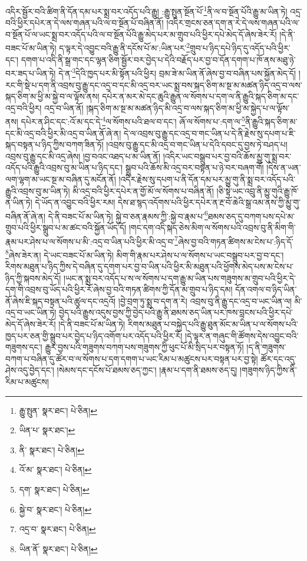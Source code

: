 འདིར་སྦྱོར་བའི་ཚིག་ནི་དོན་དམ་པར་སྨྲ་བར་འདོད་པའི་རྒྱུ། :རྒྱུ་སྤུན་སྔོན་པོ་\footnote{རྒྱུ་སྤུན་  སྣར་ཐང་།  པེ་ཅིན། }ནི་ལ་བ་སྔོན་པོའི་རྒྱུ་མ་ཡིན་ཏེ། འདྲ་བའི་ཕྱིར་དཔེར་ན་དེ་ལས་གཞན་པའི་ལ་བ་སྔོན་པོ་བཞིན་ནོ། །འདིར་གྲངས་ཅན་དག་ན་རེ་དེ་ལས་གཞན་པའི་ལ་བ་སྔོན་པོ་ལ་ཡང་སྨྲ་བར་འདོད་པའི་ལ་བ་སྔོན་པོའི་རྒྱུ་མེད་པར་མ་གྲུབ་པའི་ཕྱིར་དཔེ་མེད་དོ་ཞེས་ཟེར་རོ། །དེ་ནི་བཟང་པོ་མ་ཡིན་ཏེ། ད་ལྟར་དེ་འབྱུང་བའི་རྒྱུ་ནི་དངོས་པོ་མ་:ཡིན་པར་\footnote{ཡིན་པ་  སྣར་ཐང་། }གྲུབ་པ་ཉིད་དཔེ་ཉིད་དུ་འདོད་པའི་ཕྱིར་དང་། དགག་པ་འདི་ནི་སྒྲ་གང་དང་ལྷན་ཅིག་སྦྱོར་བར་བྱེད་པ་དེའི་བརྗོད་པར་བྱ་བ་དོན་དགག་པ་ཁོ་ནས་མཐུ་ཉེ་བར་ཟད་པ་ཡིན་ཏེ། དེ་ན་\footnote{ནི་  སྣར་ཐང་།  པེ་ཅིན། }དེའི་ཁྱད་པར་མི་སྟོན་པའི་ཕྱིར། བྲམ་ཟེ་མ་ཡིན་ནོ་ཞེས་བྱ་བ་བཞིན་པས་སྐྱོན་མེད་དོ། །རང་གི་སྡེ་པ་དག་ནི་འབྲས་བུ་རྒྱུ་དང་འདྲ་བ་དང་མི་འདྲ་བར་ཡང་སྨྲ་བས་སྐད་ཅིག་མ་སྔ་མ་མཚན་ཉིད་འདྲ་བ་ལས་སྐད་ཅིག་མ་ཕྱི་མ་སྐྱེ་བ་ལ་ལྟོས་ནས། དཔེར་ན་མར་མེ་དང་ཆུའི་རྒྱུན་ལ་སོགས་པ་དག་ལ་ནི་རྒྱུའི་སྐད་ཅིག་མ་དང་འདྲ་བའི་ཕྱིར། འདྲ་བ་ཡིན་ནོ། །སྐད་ཅིག་མ་སྔ་མ་མཚན་ཉིད་མི་འདྲ་བ་ལས་སྐད་ཅིག་མ་ཕྱི་མ་སྐྱེད་པ་ལ་ལྟོས་ནས། དཔེར་ན་ཤིང་དང་:འོ་མ་དང་དེ་\footnote{འོ་མ་  སྣར་ཐང་།  པེ་ཅིན། }ལ་སོགས་པའི་ཐལ་བ་དང་། ཞོ་ལ་སོགས་པ་:དག་ལ་\footnote{དག་  སྣར་ཐང་།  པེ་ཅིན། }ནི་རྒྱུའི་སྐད་ཅིག་མ་དང་མི་འདྲ་བའི་ཕྱིར་མི་འདྲ་བ་ཡིན་ནོ་ཞེ་ན། དེ་ལ་འབྲས་བུ་རྒྱུ་དང་འདྲ་བ་གང་ཡིན་པ་དེ་ནི་རྗེས་སུ་དཔག་པ་ཇི་སྐད་བསྟན་པ་ཉིད་ཀྱིས་བཀག་ཟིན་ཏོ། །འབྲས་བུ་རྒྱུ་དང་མི་འདྲ་བ་གང་ཡིན་པ་དེའི་དབང་དུ་བྱས་ཏེ་བཤད་པ། འབྲས་བུ་རྒྱུ་དང་མི་འདྲ་ཞེས། །བྱ་བའང་འཐད་པ་མ་ཡིན་ནོ། །འདིར་ཡང་བསྒྲུབ་པར་བྱ་བའི་ཆོས་མྱུ་གུ་སྨྲ་བར་འདོད་པའི་རྒྱུའི་འབྲས་བུ་མ་ཡིན་པ་ཉིད་དང་། སྒྲུབ་པའི་ཆོས་མི་འདྲ་བར་བསྟན་པ་ཉེ་བར་བཞག་གོ། །དེས་ན་ཡན་ལག་ལྷག་མ་ཡང་སྔ་མ་བཞིན་དུ་མངོན་ནོ། །འདིར་རྗེས་སུ་དཔག་པ་ནི་དོན་དམ་པར་མྱུ་གུ་ནི་སྨྲ་བར་འདོད་པའི་རྒྱུའི་འབྲས་བུ་མ་ཡིན་ཏེ། མི་འདྲ་བའི་ཕྱིར་དཔེར་ན་གྱོ་མོ་ལ་སོགས་པ་བཞིན་ནོ། །ཅི་སྟེ་ཡང་འབྲུ་ནི་མྱུ་གུའི་རྒྱུ་ཁོ་ན་ཡིན་ཏེ། དེ་ཡོད་ན་འབྱུང་བའི་ཕྱིར་རམ། དེས་ཐ་སྙད་འདོགས་པའི་ཕྱིར་དཔེར་ན་རྔ་བོ་ཆེའི་སྒྲ་འམ་ནས་ཀྱི་མྱུ་གུ་བཞིན་ནོ་ཞེ་ན། དེ་ནི་བཟང་པོ་མ་ཡིན་ཏེ། སྐྱེ་བ་ཅན་རྣམས་ཀྱི་:སྐྱེ་བ་རྣམ་པ་\footnote{སྐྱེ་བ་  སྣར་ཐང་།  པེ་ཅིན། }ཐམས་ཅད་དུ་བཀག་པས་དཔེ་མ་གྲུབ་པའི་ཕྱིར་སྒྲུབ་པ་མ་ཚང་བའི་སྐྱོན་ཡོད་དོ། །གང་དག་འདི་སྐད་ཅེས་མིག་ལ་སོགས་པའི་འབྲས་བུ་ནི་མིག་གི་རྣམ་པར་ཤེས་པ་ལ་སོགས་པ་མི་:འདྲ་བ་ཡིན་པའི་ཕྱིར་མི་འདྲ་བ་\footnote{འདྲ་བ་  སྣར་ཐང་།  པེ་ཅིན། }ཞེས་བྱ་བའི་གཏན་ཚིགས་མ་ངེས་པ་:ཉིད་དོ་\footnote{ཡིན་ནོ་  སྣར་ཐང་།  པེ་ཅིན། }ཞེས་ཟེར་ན། དེ་ཡང་བཟང་པོ་མ་ཡིན་ཏེ། མིག་གི་རྣམ་པར་ཤེས་པ་ལ་སོགས་པ་ཡང་བསྒྲུབ་པར་བྱ་བ་དང་། རིགས་མཐུན་པ་ཉིད་ཀྱིས་དེ་བཞིན་དུ་དགག་པར་བྱ་བ་ཡིན་པའི་ཕྱིར་མི་མཐུན་པའི་ཕྱོགས་མེད་པས་མ་ངེས་པ་ཉིད་ཀྱི་སྐབས་མེད་དོ། །ཡང་ན་སྨྲ་བར་འདོད་པ་ས་ལ་སོགས་པ་དག་རྒྱུ་མ་ཡིན་པས་གཟུགས་མ་གྲུབ་པའི་ཕྱིར་དེ་དག་གི་འབྲས་བུ་ཡོད་པའི་ཕྱིར་རོ་ཞེས་བྱ་བའི་གཏན་ཚིགས་ཀྱི་དོན་མ་གྲུབ་པ་ཉིད་དམ། དོན་འགལ་བ་ཉིད་ཡིན་ནོ་ཞེས་ཇི་སྐད་བསྟན་པའི་ཚུལ་དང་འདྲའོ། །བྱེ་བྲག་ཏུ་སྨྲ་བ་དག་ན་རེ། འབྲས་བུ་ནི་རྒྱུ་དང་འདྲ་བ་ཡང་ཡིན་ལ། མི་འདྲ་བ་ཡང་ཡིན་ཏེ། བྱེད་པའི་རྒྱུས་འདུས་བྱས་ཀྱི་བྱེད་པའི་རྒྱུ་ནི་ཐམས་ཅད་ཡིན་པར་ཁས་བླངས་པའི་ཕྱིར་དཔེ་མེད་དོ་ཞེས་ཟེར་རོ། །དེ་ནི་བཟང་པོ་མ་ཡིན་ཏེ། རིགས་མཐུན་པ་བསྐྱེད་པའི་རྒྱུ་ཐུན་མོང་མ་ཡིན་པ་ལ་སོགས་པའི་ཁྱད་པར་ཅན་གྱི་སྒྲུབ་པར་བྱེད་པ་ཉིད་འགོག་པར་འདོད་པའི་ཕྱིར་རོ། །དེ་ལྟར་ན་གཞུང་གི་ཚོགས་དེས་འབྱུང་བའི་གཟུགས་དང་། རྒྱུར་བྱས་པའི་གཟུགས་བཀག་པས་གཟུགས་ཀྱི་ཕུང་པོ་མི་སྲིད་པར་བསྟན་ཏོ། །ད་ནི་གཟུགས་བཀག་པ་བཞིན་དུ་ཚོར་བ་ལ་སོགས་པ་དག་དགག་པ་ཡང་རིམ་པ་མཚུངས་པར་བསྟན་པར་བྱ་སྟེ། ཚོར་དང་འདུ་ཤེས་འདུ་བྱེད་དང་། །སེམས་དང་དངོས་པོ་ཐམས་ཅད་ཀྱང་། །རྣམ་པ་དག་ནི་ཐམས་ཅད་དུ། །གཟུགས་ཉིད་ཀྱིས་ནི་རིམ་པ་མཚུངས། 